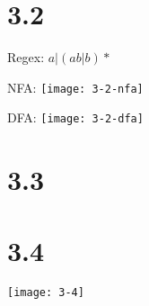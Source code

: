 \documentclass{article}
\begin{document}
\section*{3.2}

Regex: $a|(ab|b)*$

NFA: \texttt{[image: 3-2-nfa]}

DFA: \texttt{[image: 3-2-dfa]}

\section*{3.3}



\section*{3.4}

\texttt{[image: 3-4]}
\end{document}
